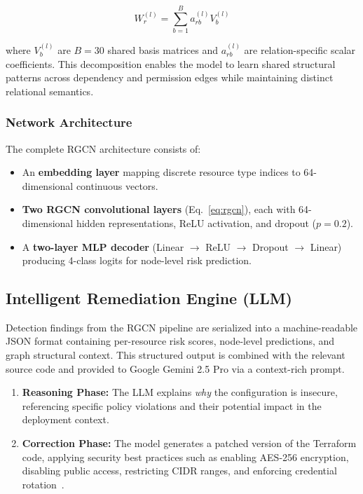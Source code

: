 \documentclass[conference]{IEEEtran}
\begin{document}
\begin{equation}
W_r^{(l)} = \sum_{b=1}^{B} a_{rb}^{(l)} V_b^{(l)}
\label{eq:basis}
\end{equation}

where $V_b^{(l)}$ are $B = 30$ shared basis matrices and $a_{rb}^{(l)}$ are relation-specific scalar coefficients. This decomposition enables the model to learn shared structural patterns across dependency and permission edges while maintaining distinct relational semantics.

\subsubsection{Network Architecture}

The complete RGCN architecture consists of:

\begin{itemize}
    \item An \textbf{embedding layer} mapping discrete resource type indices to 64-dimensional continuous vectors.
    \item \textbf{Two RGCN convolutional layers} (Eq.~\ref{eq:rgcn}), each with 64-dimensional hidden representations, ReLU activation, and dropout ($p = 0.2$).
    \item A \textbf{two-layer MLP decoder} (Linear $\rightarrow$ ReLU $\rightarrow$ Dropout $\rightarrow$ Linear) producing 4-class logits for node-level risk prediction.
\end{itemize}

\subsection{Intelligent Remediation Engine (LLM)}

Detection findings from the RGCN pipeline are serialized into a machine-readable JSON format containing per-resource risk scores, node-level predictions, and graph structural context. This structured output is combined with the relevant source code and provided to Google Gemini 2.5 Pro via a context-rich prompt.

\begin{enumerate}
    \item \textbf{Reasoning Phase:} The LLM explains \textit{why} the configuration is insecure, referencing specific policy violations and their potential impact in the deployment context.
    \item \textbf{Correction Phase:} The model generates a patched version of the Terraform code, applying security best practices such as enabling AES-256 encryption, disabling public access, restricting CIDR ranges, and enforcing credential rotation~\cite{palavalli2024}.
\end{enumerate}
\end{document}
